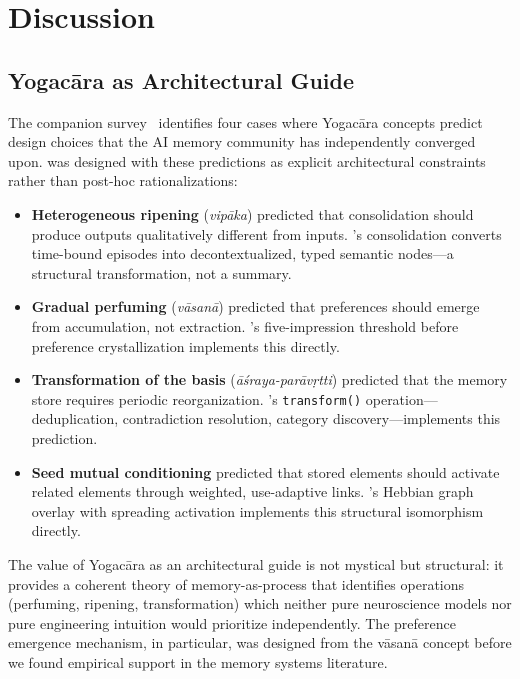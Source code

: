\section{Discussion}
\label{sec:discussion}

\subsection{Yogac\=ara as Architectural Guide}

The companion survey~\cite{hui2026taxonomy} identifies four cases where
Yogac\=ara concepts predict design choices that the AI memory community has
independently converged upon. \alaya{} was designed with these predictions
as explicit architectural constraints rather than post-hoc rationalizations:

\begin{itemize}[nosep]
    \item \textbf{Heterogeneous ripening} (\emph{vip\=aka}) predicted that
    consolidation should produce outputs qualitatively different from inputs.
    \alaya{}'s consolidation converts time-bound episodes into
    decontextualized, typed semantic nodes---a structural transformation,
    not a summary.
    \item \textbf{Gradual perfuming} (\emph{v\=asan\=a}) predicted that
    preferences should emerge from accumulation, not extraction. \alaya{}'s
    five-impression threshold before preference crystallization implements
    this directly.
    \item \textbf{Transformation of the basis}
    (\emph{\=a\'sraya-par\=av\d{r}tti}) predicted that the memory store
    requires periodic reorganization. \alaya{}'s \texttt{transform()}
    operation---deduplication, contradiction resolution, category
    discovery---implements this prediction.
    \item \textbf{Seed mutual conditioning} predicted that stored elements
    should activate related elements through weighted, use-adaptive links.
    \alaya{}'s Hebbian graph overlay with spreading activation implements
    this structural isomorphism directly.
\end{itemize}

The value of Yogac\=ara as an architectural guide is not mystical but
structural: it provides a coherent theory of memory-as-process that
identifies operations (perfuming, ripening, transformation) which neither
pure neuroscience models nor pure engineering intuition would prioritize
independently. The preference emergence mechanism, in particular, was
designed from the v\=asan\=a concept before we found empirical support in
the memory systems literature.

